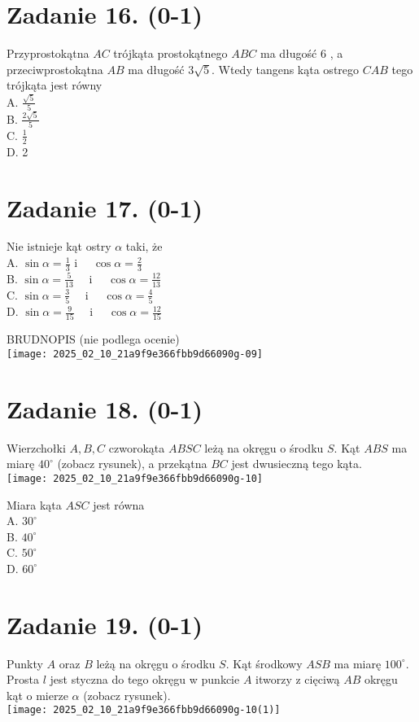 \documentclass[10pt]{article}
\begin{document}
\section*{Zadanie 16. (0-1)}
Przyprostokątna \(A C\) trójkąta prostokątnego \(A B C\) ma długość 6 , a przeciwprostokątna \(A B\) ma długość \(3 \sqrt{5}\). Wtedy tangens kąta ostrego \(C A B\) tego trójkąta jest równy\\
A. \(\frac{\sqrt{5}}{5}\)\\
B. \(\frac{2 \sqrt{5}}{5}\)\\
C. \(\frac{1}{2}\)\\
D. 2

\section*{Zadanie 17. (0-1)}
Nie istnieje kąt ostry \(\alpha\) taki, że\\
A. \(\sin \alpha=\frac{1}{3}\) i \(\quad \cos \alpha=\frac{2}{3}\)\\
B. \(\sin \alpha=\frac{5}{13} \quad\) i \(\quad \cos \alpha=\frac{12}{13}\)\\
C. \(\sin \alpha=\frac{3}{5} \quad\) i \(\quad \cos \alpha=\frac{4}{5}\)\\
D. \(\sin \alpha=\frac{9}{15} \quad\) i \(\quad \cos \alpha=\frac{12}{15}\)

BRUDNOPIS (nie podlega ocenie)\\
\texttt{[image: 2025\_02\_10\_21a9f9e366fbb9d66090g-09]}

\section*{Zadanie 18. (0-1)}
Wierzchołki \(A, B, C\) czworokąta \(A B S C\) leżą na okręgu o środku \(S\). Kąt \(A B S\) ma miarę \(40^{\circ}\) (zobacz rysunek), a przekątna \(B C\) jest dwusieczną tego kąta.\\
\texttt{[image: 2025\_02\_10\_21a9f9e366fbb9d66090g-10]}

Miara kąta \(A S C\) jest równa\\
A. \(30^{\circ}\)\\
B. \(40^{\circ}\)\\
C. \(50^{\circ}\)\\
D. \(60^{\circ}\)

\section*{Zadanie 19. (0-1)}
Punkty \(A\) oraz \(B\) leżą na okręgu o środku \(S\). Kąt środkowy \(A S B\) ma miarę \(100^{\circ}\). Prosta \(l\) jest styczna do tego okręgu w punkcie \(A\) itworzy z cięciwą \(A B\) okręgu kąt o mierze \(\alpha\) (zobacz rysunek).\\
\texttt{[image: 2025\_02\_10\_21a9f9e366fbb9d66090g-10(1)]}
\end{document}

